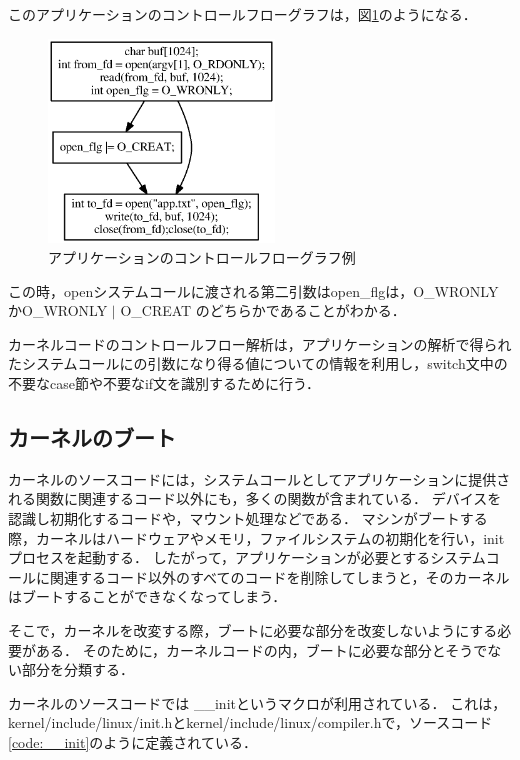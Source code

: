 \documentclass[graduation-thesis]{mlarticle}
\begin{document}
このアプリケーションのコントロールフローグラフは，図\ref{fig:controlflow}のようになる．

\begin{figure}[H]
  \begin{center}
    \includegraphics[width=6.0cm]{images/controlflow.eps}
    \caption{アプリケーションのコントロールフローグラフ例}
    \label{fig:controlflow}
  \end{center}
\end{figure}

この時，openシステムコールに渡される第二引数はopen\_flgは，O\_WRONLYかO\_WRONLY $|$ O\_CREAT のどちらかであることがわかる．


カーネルコードのコントロールフロー解析は，アプリケーションの解析で得られたシステムコールにの引数になり得る値についての情報を利用し，switch文中の不要なcase節や不要なif文を識別するために行う．

\subsection{カーネルのブート}
\label{propo:boot}
カーネルのソースコードには，システムコールとしてアプリケーションに提供される関数に関連するコード以外にも，多くの関数が含まれている．
デバイスを認識し初期化するコードや，マウント処理などである．
マシンがブートする際，カーネルはハードウェアやメモリ，ファイルシステムの初期化を行い，initプロセスを起動する．
したがって，アプリケーションが必要とするシステムコールに関連するコード以外のすべてのコードを削除してしまうと，そのカーネルはブートすることができなくなってしまう．

そこで，カーネルを改変する際，ブートに必要な部分を改変しないようにする必要がある．
そのために，カーネルコードの内，ブートに必要な部分とそうでない部分を分類する．

カーネルのソースコードでは \_\_initというマクロが利用されている．
これは，kernel/include/linux/init.hとkernel/include/linux/compiler.hで，ソースコード\ref{code:__init}のように定義されている．
\end{document}
